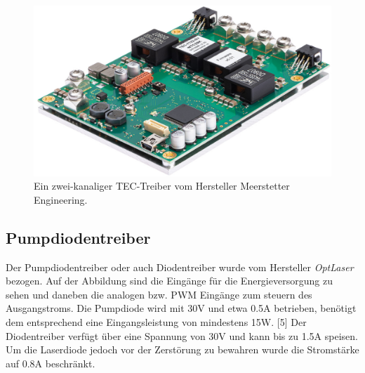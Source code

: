 \begin{figure}[H]
    \centering
    \includegraphics[scale=0.2]{98_images/tec_controller_real_isometry_meerstetter.PNG}
    \caption{Ein zwei-kanaliger TEC-Treiber vom Hersteller Meerstetter Engineering.}
    \label{fig:tec_treiber_hw}
\end{figure}

\subsection{Pumpdiodentreiber}
\label{chptr:_diodentreiber}
Der Pumpdiodentreiber oder auch Diodentreiber wurde vom Hersteller \textit{OptLaser} bezogen. Auf der Abbildung sind die Eingänge für die Energieversorgung zu sehen und daneben die analogen bzw. PWM
Eingänge zum steuern des Ausgangstroms. Die Pumpdiode wird mit 30V und etwa 0.5A betrieben, benötigt dem entsprechend eine Eingangsleistung von mindestens 15W. [5] Der Diodentreiber verfügt über eine Spannung von 30V und kann bis zu 1.5A speisen. Um die Laserdiode jedoch vor der Zerstörung zu bewahren wurde die Stromstärke auf 0.8A beschränkt.

